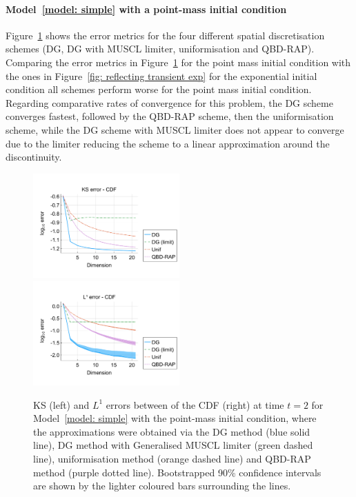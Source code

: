 \paragraph{Model~\ref{model: simple} with a point-mass initial condition}
Figure~\ref{fig: reflecting transient pm} shows the error metrics for the four different spatial discretisation schemes (DG, DG with MUSCL limiter, uniformisation and QBD-RAP). Comparing the error metrics in Figure~\ref{fig: reflecting transient pm} for the point mass initial condition with the ones in Figure~\ref{fig: reflecting transient exp} for the exponential initial condition all schemes perform worse for the point mass initial condition. Regarding comparative rates of convergence for this problem, the DG scheme converges fastest, followed by the QBD-RAP scheme, then the uniformisation scheme, while the DG scheme with MUSCL limiter does not appear to converge due to the limiter reducing the scheme to a linear approximation around the discontinuity. %
\begin{figure}[h]
	\centering
	\includegraphics[width=0.5\textwidth,trim={0.75cm 0.8cm 0.25cm 1.25cm},clip]{chapter6/figs/hitting_times_model/reflecting_model/transient_distribution/point_mass/ks_error_formatted.pdf}%
	\includegraphics[width=0.5\textwidth,trim={0.75cm 0.8cm 0.25cm 1.25cm},clip]{chapter6/figs/hitting_times_model/reflecting_model/transient_distribution/point_mass/l1_cdf_error_formatted.pdf}
	\caption{KS (left) and \(L^1\) errors between of the CDF (right) at time \(t=2\) for Model~\ref{model: simple} with the point-mass initial condition, where the approximations were obtained via the DG method (blue solid line), DG method with Generalised MUSCL limiter (green dashed line), uniformisation method (orange dashed line) and QBD-RAP method (purple dotted line). Bootstrapped 90\% confidence intervals are shown by the lighter coloured bars surrounding the lines.} 
	\label{fig: reflecting transient pm} 
\end{figure}

